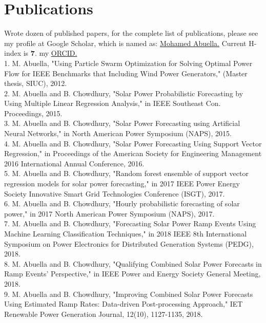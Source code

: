 \documentclass[11pt,letterpaper,sans]{moderncv}
\begin{document}
\section{Publications}
Wrote dozen of published papers, for the complete list of publications, please see my profile at Google Scholar, which is named as:
\href{https://scholar.google.com/citations?user=nJbFUkcAAAAJ&hl=en}{\underline{\textcolor[rgb]{0.00,0.07,1.00}{Mohamed Abuella}}.} Current H-index is \textbf{7}. my  \href{https://orcid.org/0000-0001-8018-9998}{\underline{\textcolor[rgb]{0.00,0.07,1.00}{ORCID}}.}
\\
1. M. Abuella, "Using Particle Swarm Optimization for Solving Optimal Power Flow for IEEE Benchmarks that Including Wind Power Generators," (Master thesis, SIUC), 2012.\\
2. M. Abuella and B. Chowdhury, "Solar Power Probabilistic Forecasting by Using Multiple Linear Regression Analysis," in IEEE Southeast Con. Proceedings, 2015.\\
3. M. Abuella and B. Chowdhury, "Solar Power Forecasting using Artificial Neural Networks," in North American Power Symposium (NAPS), 2015.\\
4. M. Abuella and B. Chowdhury, "Solar Power Forecasting Using Support Vector Regression," in Proceedings of the American Society for Engineering Management 2016 International Annual Conference, 2016.\\
5. M. Abuella and B. Chowdhury, "Random forest ensemble of support vector regression models for solar power forecasting," in 2017 IEEE Power Energy Society Innovative Smart Grid Technologies Conference (ISGT), 2017.\\
6. M. Abuella and B. Chowdhury, "Hourly probabilistic forecasting of solar power," in 2017 North American Power Symposium (NAPS), 2017.\\
7. M. Abuella and B. Chowdhury, "Forecasting Solar Power Ramp Events Using Machine Learning Classification Techniques," in 2018 IEEE 8th International Symposium on Power Electronics for Distributed Generation Systems (PEDG), 2018.\\
8. M. Abuella and B. Chowdhury, "Qualifying Combined Solar Power Forecasts in Ramp Events' Perspective," in IEEE Power and Energy Society General Meeting, 2018.\\
9. M. Abuella and B. Chowdhury, "Improving Combined Solar Power Forecasts Using Estimated Ramp Rates: Data-driven Post-processing Approach," IET Renewable Power Generation Journal, 12(10), 1127-1135, 2018.\\
\end{document}
